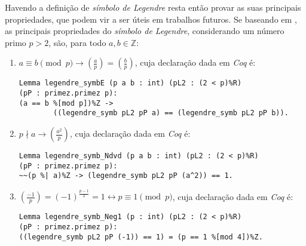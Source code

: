 Havendo a definição de \textit{símbolo de Legendre} resta então provar as suas principais propriedades, que podem vir a ser úteis em trabalhos futuros. Se baseando em \cite{book:2399854}, as principais propriedades do \textit{símbolo de Legendre}, considerando um número primo $p > 2$, são, para todo $a, b \in \mathbb{Z}$:
\begin{enumerate}
        \item $a \equiv b \pmod{p} \rightarrow \left(\frac{a}{p}\right) = \left(\frac{b}{p}\right)$, cuja declaração dada em \textit{Coq} é:
        \begin{tcolorbox}[colback=yellow!5!white,colframe=yellow!75!black,width=14cm]
        \begin{lstlisting}[language=coq]
Lemma legendre_symbE (p a b : int) (pL2 : (2 < p)%R) 
(pP : primez.primez p):
(a == b %[mod p])%Z -> 
        ((legendre_symb pL2 pP a) == (legendre_symb pL2 pP b)).
        \end{lstlisting}
        \end{tcolorbox}
        
        \item $p \nmid a \rightarrow \left(\frac{a^2}{p}\right)$, cuja declaração dada em \textit{Coq} é:
        \begin{tcolorbox}[colback=yellow!5!white,colframe=yellow!75!black,width=14cm]
        \begin{lstlisting}[language=coq]
Lemma legendre_symb_Ndvd (p a b : int) (pL2 : (2 < p)%R) 
(pP : primez.primez p):
~~(p %| a)%Z -> (legendre_symb pL2 pP (a^2)) == 1.
        \end{lstlisting}
        \end{tcolorbox}
        
        \item $\left(\frac{-1}{p}\right) = (-1)^{\frac{p - 1}{2}} = 1 \leftrightarrow p \equiv 1 \pmod{p}$, cuja declaração dada em \textit{Coq} é:
        \begin{tcolorbox}[colback=yellow!5!white,colframe=yellow!75!black,width=14cm]
        \begin{lstlisting}[language=coq]
Lemma legendre_symb_Neg1 (p : int) (pL2 : (2 < p)%R) 
(pP : primez.primez p):
((legendre_symb pL2 pP (-1)) == 1) = (p == 1 %[mod 4])%Z.
        \end{lstlisting}
        \end{tcolorbox}
        
        

\end{enumerate}
